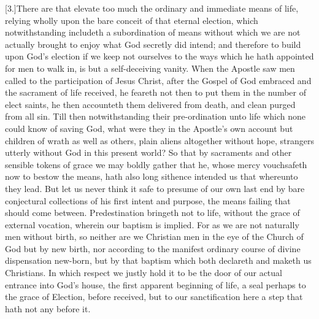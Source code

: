 [3.]There are that elevate too much the ordinary and immediate means of life, relying wholly upon the bare conceit of that eternal election, which notwithstanding includeth a subordination of means without which we are not actually brought to enjoy what God secretly did intend; and therefore to build upon God’s election if we keep not ourselves to the ways which he hath appointed for men to walk in, is but a self-deceiving vanity. When the Apostle saw men called to the participation of Jesus Christ, after the Gospel of God embraced and the sacrament of life received, he feareth not then to put them in the number of elect saints, he then accounteth them delivered from death, and clean purged from all sin. Till then notwithstanding their pre-ordination unto life which none could know of saving God, what were they in the Apostle’s own account but children of wrath as well as others, plain aliens altogether without hope, strangers utterly without God in this present world? So that by sacraments and other sensible tokens of grace we may boldly gather that he, whose mercy vouchsafeth now to bestow the means, hath also long sithence intended us that whereunto they lead. But let us never think it safe to presume of our own last end by bare conjectural collections of his first intent  and purpose, the means failing that should come between. Predestination bringeth not to life, without the grace of external vocation, wherein our baptism is implied.
 For as we are not naturally men without birth, so neither are we Christian men in the eye of the Church of God but by new birth, nor according to the manifest ordinary course of divine dispensation new-born, but by that baptism which both declareth and maketh us Christians. In which respect we justly hold it to be the door of our actual entrance into God’s house, the first apparent beginning of life, a seal perhaps to the grace of Election, before received, but to our sanctification here a step that hath not any before it.

